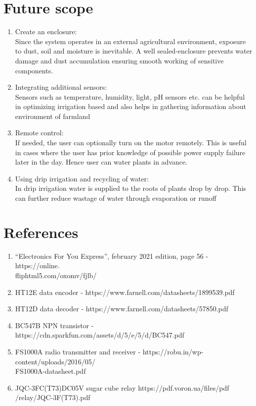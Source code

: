 \documentclass[12pt, a4paper]{report}
\begin{document}
\chapter{Future scope}
\begin{enumerate}
  \item Create an enclosure: \\
    Since the system operates in an external agricultural
    environment, exposure to    dust, soil and moisture is
    inevitable. A well sealed-enclosure prevents water damage and
    dust accumulation ensuring smooth working of sensitive components.
  \item Integrating additional sensors: \\
    Sensors such as temperature, humidity, light, pH sensors etc. can
    be helpful in optimizing irrigation based and also helps in
    gathering information about environment of farmland
  \item Remote control: \\
    If needed, the user can optionally turn on the motor remotely.
    This is useful in cases where the user has prior knowledge of
    possible power supply failure later in the day. Hence user can
    water plants in advance.
  \item Using drip irrigation and recycling of water: \\
    In  drip irrigation water is supplied to the roots of plants drop
    by drop. This can further reduce wastage of water through
    evaporation or runoff
\end{enumerate}

\newpage
\chapter{References}
\begin{enumerate}
  \item “Electronics For You Express”, february 2021 edition, page 56
    - https://online.\\fliphtml5.com/oxomv/fjlb/
  \item HT12E data encoder - https://www.farnell.com/datasheets/1899539.pdf
  \item HT12D data decoder - https://www.farnell.com/datasheets/57850.pdf
  \item BC547B NPN transistor -
    https://cdn.sparkfun.com/assets/d/5/e/5/d/BC547.pdf
  \item FS1000A radio transmitter and receiver -
    https://robu.in/wp-content/uploads/2016/05/\\FS1000A-datasheet.pdf
  \item JQC-3FC(T73)DC05V sugar cube relay
    https://pdf.voron.ua/files/pdf\\/relay/JQC-3F(T73).pdf
\end{enumerate}
\end{document}
